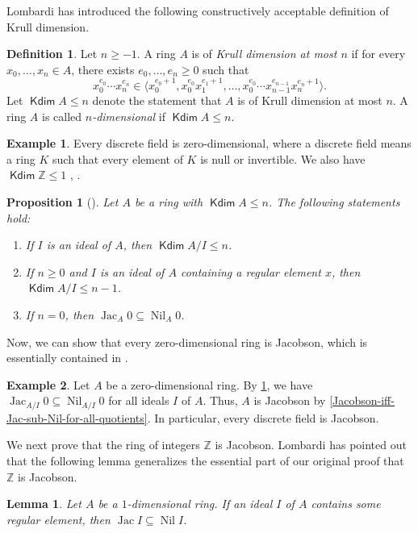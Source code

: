 \documentclass[11pt]{article}
\newtheorem{lemma}{Lemma}[section]
\newtheorem{proposition}{Proposition}[section]
\theoremstyle{definition}
\newtheorem{definition}{Definition}[section]
\newtheorem{example}{Example}[section]
\newcommand\gen[1]{\langle{#1}\rangle}
\newcommand\Z{\mathbb{Z}}
\DeclareMathOperator{\Nil}{Nil}
\DeclareMathOperator{\Jac}{Jac}
\DeclareMathOperator{\Kdim}{\mathsf{Kdim}}
\begin{document}
Lombardi \cite[Définition 5.1]{Lom02} has introduced the following constructively acceptable definition of Krull dimension.
\begin{definition}
    Let $n\ge-1$. A ring $A$ is of \emph{Krull dimension at most $n$} if for every $x_0,\ldots,x_n\in A$, there exists $e_0,\ldots,e_n\ge0$ such that
    \[x_0^{e_0}\cdots x_n^{e_n}\in\gen{x_0^{e_0+1},x_0^{e_0}x_1^{e_1+1},\ldots,x_0^{e_0}\cdots x_{n-1}^{e_{n-1}}x_n^{e_n+1}}.\]
    Let $\Kdim A\le n$ denote the statement that $A$ is of Krull dimension at most $n$.
    A ring $A$ is called \emph{$n$-dimensional} if $\Kdim A\le n$.
\end{definition}
\begin{example}
    Every discrete field is zero-dimensional, where a discrete field means a ring $K$ such that every element of $K$ is null or invertible.
    We also have $\Kdim\Z\le1$ \cite[Examples below Lemma XIII-2.4]{LQ15}, \cite[Examples 86]{Yen15}.
\end{example}
\begin{proposition}[{\cite[Proposition XIII-3.1, Lemma IX-1.2]{LQ15}}]\label{Kdim-proposition}
    Let $A$ be a ring with $\Kdim A\le n$. The following statements hold:
    \begin{enumerate}
        \item If $I$ is an ideal of $A$, then $\Kdim A/I\le n$.
        \item If $n\ge0$ and $I$ is an ideal of $A$ containing a regular element $x$, then $\Kdim A/I\le n-1$.
        \item If $n=0$, then $\Jac_A0\subseteq\Nil_A0$.
    \end{enumerate}
\end{proposition}
Now, we can show that every zero-dimensional ring is Jacobson, which is essentially contained in \cite[Lemma IX-1.2]{LQ15}.
\begin{example}\label{zero-dim-implies-Jacobson}
    Let $A$ be a zero-dimensional ring.
    By \cref{Kdim-proposition}, we have $\Jac_{A/I}0\subseteq\Nil_{A/I}0$ for all ideals $I$ of $A$.
    Thus, $A$ is Jacobson by \cref{Jacobson-iff-Jac-sub-Nil-for-all-quotients}. In particular, every discrete field is Jacobson.
\end{example}
We next prove that the ring of integers $\Z$ is Jacobson.
Lombardi \cite{Lom24} has pointed out that the following lemma generalizes the essential part of our original proof that $\Z$ is Jacobson.
\begin{lemma}\label{Kdim1-Jacobson-lemma}
    Let $A$ be a $1$-dimensional ring. If an ideal $I$ of $A$ contains some regular element, then $\Jac I\subseteq\Nil I$.
\end{lemma}
\end{document}
